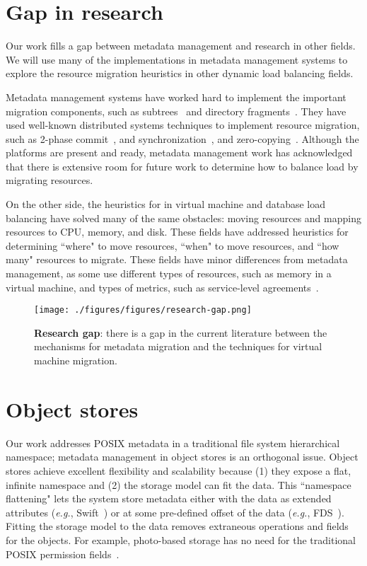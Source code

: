 \section{Gap in research}
Our work fills a gap between metadata management and research in other fields. We will use many of the implementations in metadata management systems to explore the resource migration heuristics in other dynamic load balancing fields.

Metadata management systems have worked hard to implement the important migration components, such as subtrees~\cite{weil:osdi2006-ceph,weil:sc2004-dyn-metadata} and directory fragments~\cite{patil:pdsw2007-giga+}. They have used well-known distributed systems techniques to implement resource migration, such as 2-phase commit~\cite{weil:phdthesis07}, and synchronization~\cite{patil:pdsw2007-giga+}, and zero-copying~\cite{sinnamohideen:atc2010-ursa}. Although the platforms are present and ready, metadata management work has acknowledged that there is extensive room for future work to determine how to balance load by migrating resources. 

On the other side, the heuristics for in virtual machine and database load balancing have solved many of the same obstacles: moving resources and mapping resources to CPU, memory, and disk. These fields have addressed heuristics for determining ``where" to move resources, ``when" to move resources, and ``how many" resources to migrate. These fields have minor differences from metadata management, as some use different types of resources, such as memory in a virtual machine, and types of metrics, such as service-level agreements~\cite{wood:nsdi07-sandpiper}. 

\begin{figure}[tbh]
	\centering
	\texttt{[image: ./figures/figures/research-gap.png]} 
	\caption{\textbf{Research gap}: there is a gap in the current literature between the mechanisms for metadata migration and the techniques for virtual machine migration.\label{research-gap}}
\end{figure}

\section{Object stores}
Our work addresses POSIX metadata in a traditional file system hierarchical namespace; metadata management in object stores is an orthogonal issue. Object stores achieve excellent flexibility and scalability because (1) they expose a flat, infinite namespace and (2) the storage model can fit the data. This ``namespace flattening" lets the system store metadata either with the data as extended attributes ({\it e.g.}, Swift~\cite{toor:nas2012-swift}) or at some pre-defined offset of the data ({\it e.g.}, FDS~\cite{nightingale:osdi2012-fds}). Fitting the storage model to the data removes extraneous operations and fields for the objects. For example, photo-based storage has no need for the traditional POSIX permission fields~\cite{beaver:osdi2010-haystack}. 

